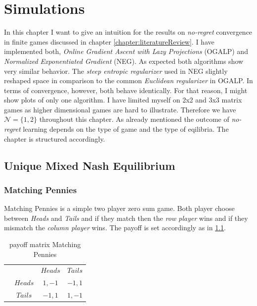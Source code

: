 
\chapter{Simulations}\label{chapter:simulations}

In this chapter I want to give an intuition for the results on \textit{no-regret} convergence in finite games discussed in chapter \ref{chapter:literatureReview}. I have implemented both, \textit{Online Gradient Ascent with Lazy Projections} (OGALP) and \textit{Normalized Exponentiated Gradient} (NEG). As expected both algorithms show very similar behavior. The \textit{steep entropic regularizer} used in NEG slightly reshaped space in comparison to the common \textit{Euclidean regularizer} in OGALP. In terms of convergence, however, both behave identically. For that reason, I might show plots of only one algorithm.  I have limited myself on 2x2 and 3x3 matrix games as higher dimensional games are hard to illustrate. Therefore we have $\mathcal{N} = \{1,2\}$ throughout this chapter. As already mentioned the outcome of \textit{no-regret} learning depends on the type of game and the type of eqilibria. The chapter is structured accordingly. 

\section{Unique Mixed Nash Equilibrium}\label{section:uniqueMixedNashEquilibrium}

\subsection{Matching Pennies}\label{subsection:machtingPennies}

Matching Pennies is a simple two player zero sum game. Both player choose between \textit{Heads} and \textit{Tails} and if they match then the \textit{row player} wins and if they mismatch the \textit{column player} wins. The payoff is set accordingly as in \ref{tab:payoffMachtingPennies}. 

\begin{table}[H]\centering
\setlength{\extrarowheight}{2pt}
\begin{tabular}{cc|c|c|}
  & \multicolumn{1}{c}{} & \multicolumn{1}{c}{$Heads$}  & \multicolumn{1}{c}{$Tails$} \\\cline{3-4}
  & $Heads$ & $1,-1$ & $-1,1$ \\\cline{3-4}
  & $Tails$ & $-1,1$ & $1,-1$ \\\cline{3-4}
\end{tabular}\caption{\label{tab:payoffMachtingPennies}payoff matrix Matching Pennies}
\end{table}

